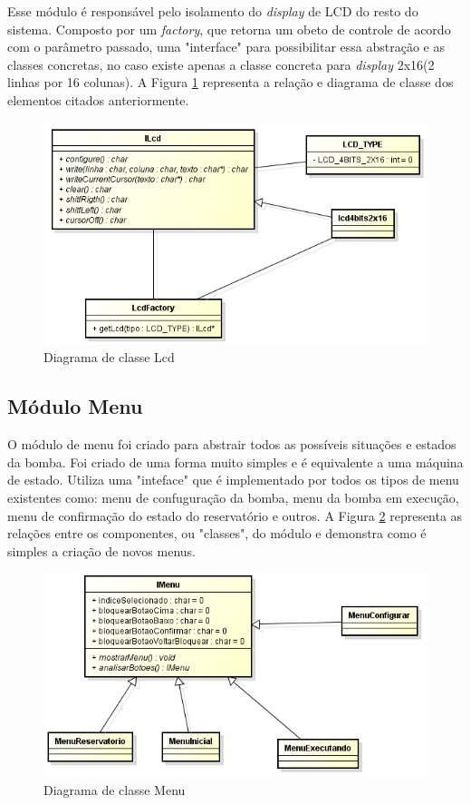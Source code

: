 Esse módulo é responsável pelo isolamento do \emph{display} de LCD do resto do sistema. Composto por um \emph{factory}, que retorna um obeto de controle de acordo com o parâmetro passado, uma "interface" para possibilitar essa abstração e as classes concretas, no caso existe apenas a classe concreta para \emph{display} 2x16(2 linhas por 16 colunas). A Figura \ref{fig:diagramalcd} representa a relação e diagrama de classe dos elementos citados anteriormente.

\begin{figure}[htp]
	\centering
	\includegraphics[scale=0.8]{images/classe_lcd.png}
	\caption{Diagrama de classe Lcd}	
	\label{fig:diagramalcd}
\end{figure}

\subsection{Módulo Menu}

O módulo de menu foi criado para abstrair todos as possíveis situações e estados da bomba. Foi criado de uma forma muito simples e é equivalente a uma máquina de estado. Utiliza uma "inteface" que é implementado por todos os tipos de menu existentes como: menu de confuguração da bomba, menu da bomba em execução, menu de confirmação do estado do reservatório e outros. A Figura \ref{fig:classemenu} representa as relações entre os componentes, ou "classes", do módulo e demonstra como é simples a criação de novos menus.

\begin{figure}[htp]
	\centering
	\includegraphics[scale=1]{images/classe_menu.png}
	\caption{Diagrama de classe Menu}	
	\label{fig:classemenu}
\end{figure}


